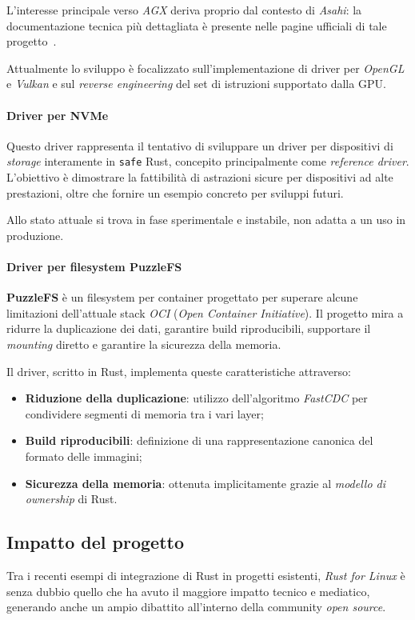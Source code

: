 L'interesse principale verso \textit{AGX} deriva proprio dal contesto di \textit{Asahi}: la documentazione tecnica più dettagliata è presente
nelle pagine ufficiali di tale progetto~\cite{asahi}.

Attualmente lo sviluppo è focalizzato sull'implementazione di driver per \textit{OpenGL} e \textit{Vulkan} e sul \textit{reverse engineering} del set di istruzioni 
supportato dalla GPU.\ 

\paragraph{Driver per NVMe}
Questo driver rappresenta il tentativo di sviluppare un driver per dispositivi di \textit{storage} interamente in \texttt{safe} Rust, concepito principalmente come \textit{reference driver}.
L'obiettivo è dimostrare la fattibilità di astrazioni sicure per dispositivi ad alte prestazioni, oltre che fornire un esempio concreto per sviluppi futuri.

Allo stato attuale si trova in fase sperimentale e instabile, non adatta a un uso in produzione.

\paragraph{Driver per filesystem PuzzleFS}
\textbf{PuzzleFS} è un filesystem per container progettato per superare alcune limitazioni dell'attuale stack \textit{OCI} (\textit{Open Container Initiative}).
Il progetto mira a ridurre la duplicazione dei dati, garantire build riproducibili, supportare il \textit{mounting} diretto e garantire la sicurezza della memoria.

Il driver, scritto in Rust, implementa queste caratteristiche attraverso:
\begin{itemize}
    \item \textbf{Riduzione della duplicazione}: utilizzo dell'algoritmo \textit{FastCDC} per condividere segmenti di memoria tra i vari layer;
    \item \textbf{Build riproducibili}: definizione di una rappresentazione canonica del formato delle immagini;
    \item \textbf{Sicurezza della memoria}: ottenuta implicitamente grazie al \textit{modello di ownership} di Rust.
\end{itemize}

\subsection{Impatto del progetto}
Tra i recenti esempi di integrazione di Rust in progetti esistenti, \textit{Rust for Linux} è senza dubbio quello che ha avuto il maggiore impatto tecnico 
e mediatico, generando anche un ampio dibattito all'interno della community \textit{open source}.

